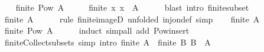 \begin{isabellebody}
%
\isadelimproof
%
\endisadelimproof
%
\isatagproof
{}\isamarkupfalse%
\isanewline
\ \ \isamarkupfalse%
\ {\isachardoublequoteopen}finite\ {\isacharparenleft}{\kern0pt}Pow\ A{\isacharparenright}{\kern0pt}{\isachardoublequoteclose}\isanewline
\ \ \isamarkupfalse%
\ \isamarkupfalse%
\ {\isachardoublequoteopen}finite\ {\isacharparenleft}{\kern0pt}{\isacharparenleft}{\kern0pt}{\isasymlambda}x{\isachardot}{\kern0pt}\ {\isacharbraceleft}{\kern0pt}x{\isacharbraceright}{\kern0pt}{\isacharparenright}{\kern0pt}\ {\isacharbackquote}{\kern0pt}\ A{\isacharparenright}{\kern0pt}{\isachardoublequoteclose}\isanewline
\ \ \ \ \isamarkupfalse%
\ {\isacharparenleft}{\kern0pt}blast\ intro{\isacharcolon}{\kern0pt}\ finite{\isacharunderscore}{\kern0pt}subset{\isacharparenright}{\kern0pt}\ \ \isanewline
\ \ \isamarkupfalse%
\ \isamarkupfalse%
\ {\isachardoublequoteopen}finite\ A{\isachardoublequoteclose}\isanewline
\ \ \ \ \isamarkupfalse%
\ {\isacharparenleft}{\kern0pt}rule\ finite{\isacharunderscore}{\kern0pt}imageD\ {\isacharbrackleft}{\kern0pt}unfolded\ inj{\isacharunderscore}{\kern0pt}on{\isacharunderscore}{\kern0pt}def{\isacharbrackright}{\kern0pt}{\isacharparenright}{\kern0pt}\ simp\isanewline
{}\isamarkupfalse%
\isanewline
\ \ \isamarkupfalse%
\ {\isachardoublequoteopen}finite\ A{\isachardoublequoteclose}\isanewline
\ \ \isamarkupfalse%
\ \isamarkupfalse%
\ {\isachardoublequoteopen}finite\ {\isacharparenleft}{\kern0pt}Pow\ A{\isacharparenright}{\kern0pt}{\isachardoublequoteclose}\isanewline
\ \ \ \ \isamarkupfalse%
\ induct\ {\isacharparenleft}{\kern0pt}simp{\isacharunderscore}{\kern0pt}all\ add{\isacharcolon}{\kern0pt}\ Pow{\isacharunderscore}{\kern0pt}insert{\isacharparenright}{\kern0pt}\isanewline
{}\isamarkupfalse%
%
\endisatagproof
{\isafoldproof}%
%
\isadelimproof
\isanewline
%
\endisadelimproof
\isanewline
{}\isamarkupfalse%
\ finite{\isacharunderscore}{\kern0pt}Collect{\isacharunderscore}{\kern0pt}subsets\ {\isacharbrackleft}{\kern0pt}simp{\isacharcomma}{\kern0pt}\ intro{\isacharbrackright}{\kern0pt}{\isacharcolon}{\kern0pt}\ {\isachardoublequoteopen}finite\ A\ {\isasymLongrightarrow}\ finite\ {\isacharbraceleft}{\kern0pt}B{\isachardot}{\kern0pt}\ B\ {\isasymsubseteq}\ A{\isacharbraceright}{\kern0pt}{\isachardoublequoteclose}\isanewline
%
\isadelimproof
\ \ %
\endisadelimproof
%
\isatagproof
{}\isamarkupfalse%

\end{isabellebody}
